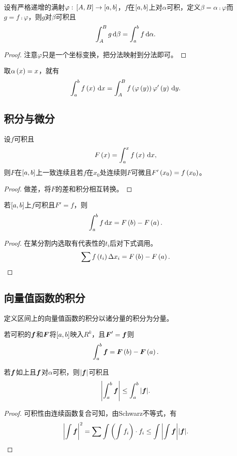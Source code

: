 \documentclass{ctexrep}
\begin{document}
  \begin{theorem}
    设有严格递增的满射$\varphi:\, \left[A,B\right] \rightarrow \left[a,b\right]$，$f$在$\left[a,b\right]$上对$\alpha$可积，定义$\beta=\alpha\comp\varphi$而$g=f\comp \varphi$，则$g$对$\beta$可积且
    \[ \int_A^B g \, \mathrm{d} \beta = \int_a^b f\, \mathrm{d} \alpha. \]
  \end{theorem}
  \begin{proof}
    注意$\varphi$只是一个坐标变换，把分法映射到分法即可。
  \end{proof}
  取$\alpha\left(x\right)=x$，就有
  \[ \int_a^b f\left(x\right)\, \mathrm{d} x = \int_A^B  f\left(\varphi\left(y\right)\right)\varphi'\left(y\right)\, \mathrm{d} y. \]
  \subsection{积分与微分}
  \begin{theorem}
    设$f$可积且
    \[ F\left(x\right) = \int_a^x f\left(x\right)\, \mathrm{d} x, \]
    则$F$在$\left[a,b\right]$上一致连续且若$f$在$x_0$处连续则$F$可微且$F'\left(x_0\right) = f\left(x_0\right)$。
  \end{theorem}
  \begin{proof}
    做差，将$F$的差和积分相互转换。
  \end{proof}
  \begin{theorem}
    \label{thm:elecalculus}
    若$\left[a,b\right]$上$f$可积且$F'=f$，则
    \[ \int_a^b f\, \mathrm{d} x = F\left(b\right)-F\left(a\right). \]
  \end{theorem}
  \begin{proof}
    在某分割内选取有代表性的$t_i$后对下式调用。
    \[ \sum f\left(t_i\right)\Delta x_i = F\left(b\right)-F\left(a\right).\qedhere \]
  \end{proof}
  \subsection{向量值函数的积分}
  \begin{definition}
    定义区间上的向量值函数的积分以诸分量的积分为分量。
  \end{definition}
  \begin{theorem}
    若可积的$\boldsymbol{f}$和$\boldsymbol{F}$将$\left[a,b\right]$映入$R^k$，且$\boldsymbol{F}'=\boldsymbol{f}$则
    \[ \int_a^b \boldsymbol{f} = \boldsymbol{F}\left(b\right) - \boldsymbol{F}\left(a\right). \]
  \end{theorem}
  \begin{theorem}
    \label{thm:ineqtriint}
    若$\boldsymbol{f}$如上且$\boldsymbol{f}$对$\alpha$可积，则$\abs{\boldsymbol{f}}$可积且
    \[ \abs{\int_a^b\boldsymbol{f}} \le \int_a^b \abs{\boldsymbol{f}}. \]
  \end{theorem}
  \begin{proof}
    可积性由连续函数复合可知，由Schwarz不等式，有
    \[ \abs{\int\boldsymbol{f}}^2 = \sum\int \left(\int f_i\right)\cdot  f_i \le \int \abs{\int \boldsymbol{f}} \abs{\boldsymbol{f}}. \qedhere \]
  \end{proof}
\end{document}
